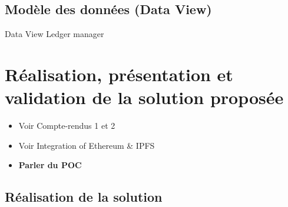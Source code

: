 \documentclass{tnreport}
\begin{document}
\section{Modèle des données (Data View)}

Data View
Ledger manager

\chapter{Réalisation, présentation et validation de la solution proposée}
\label{sec:realisation}

\begin{itemize}
	\item Voir Compte-rendus 1 et 2
	\item Voir Integration of Ethereum \& IPFS
	\item \textbf{Parler du POC}
\end{itemize}

\section{Réalisation de la solution}
\end{document}
